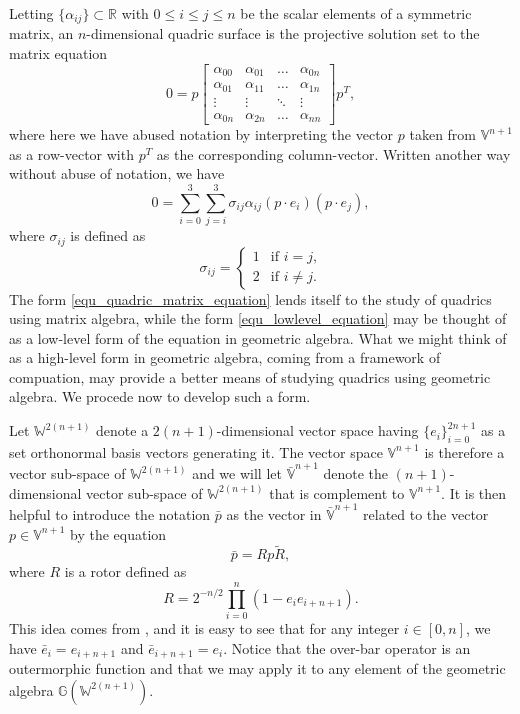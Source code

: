 \documentclass{ecgd-l}
\theoremstyle{definition}
\theoremstyle{remark}
\numberwithin{equation}{section}
\newcommand{\G}{\mathbb{G}}
\newcommand{\V}{\mathbb{V}}
\newcommand{\Vb}{\mathbb{\bar{V}}}
\newcommand{\W}{\mathbb{W}}
\newcommand{\R}{\mathbb{R}}
\begin{document}
Letting $\{\alpha_{ij}\}\subset\R$ with $0\leq i\leq j\leq n$ be the scalar elements of a symmetric
matrix, an $n$-dimensional quadric surface is the projective solution set to the
matrix equation
\begin{equation}\label{equ_quadric_matrix_equation}
0 = p\left[\begin{array}{cccc}
\alpha_{00} & \alpha_{01} & \dots & \alpha_{0n} \\
\alpha_{01} & \alpha_{11} & \dots & \alpha_{1n} \\
\vdots & \vdots & \ddots & \vdots \\
\alpha_{0n} & \alpha_{2n} & \dots & \alpha_{nn}
\end{array}\right]p^T,
\end{equation}
where here we have abused notation by interpreting the vector $p$ taken from $\V^{n+1}$ as
a row-vector with $p^T$ as the corresponding column-vector.  Written another
way without abuse of notation, we have
\begin{equation}\label{equ_lowlevel_equation}
0 = \sum_{i=0}^3\sum_{j=i}^3\sigma_{ij}\alpha_{ij}(p\cdot e_i)(p\cdot e_j),
\end{equation}
where $\sigma_{ij}$ is defined as
\begin{equation}
\sigma_{ij} = \left\{\begin{array}{ll}
1 & \mbox{if $i=j$,} \\
2 & \mbox{if $i\neq j$.}
\end{array}\right.
\end{equation}
The form \eqref{equ_quadric_matrix_equation} lends itself to the study
of quadrics using matrix algebra, while the form \eqref{equ_lowlevel_equation}
may be thought of as a low-level form of the equation in geometric algebra.
What we might think of as a high-level form in geometric algebra, coming from
a framework of compuation, may provide a better means of studying quadrics
using geometric algebra.  We procede now to develop such a form.

Let $\W^{2(n+1)}$ denote a $2(n+1)$-dimensional vector space
having $\{e_i\}_{i=0}^{2n+1}$ as a set orthonormal basis vectors
generating it.  The vector space $\V^{n+1}$ is therefore a vector
sub-space of $\W^{2(n+1)}$ and we will let $\Vb^{n+1}$ denote
the $(n+1)$-dimensional vector sub-space of $\W^{2(n+1)}$ that
is complement to $\V^{n+1}$.  It is then helpful to introduce the
notation $\bar{p}$ as the vector in $\Vb^{n+1}$ related to the
vector $p\in\V^{n+1}$ by the equation
\begin{equation}
\bar{p} = Rp\tilde{R},
\end{equation}
where $R$ is a rotor defined as
\begin{equation}
R = 2^{-n/2}\prod_{i=0}^n\left(1-e_ie_{i+n+1}\right).
\end{equation}
This idea comes from \cite{DoranHestenes93}, and it is easy to see
that for any integer $i\in[0,n]$, we have $\bar{e}_i=e_{i+n+1}$
and $\bar{e}_{i+n+1}=e_i$.  Notice that the over-bar operator
is an outermorphic function and that we may apply it to any element
of the geometric algebra $\G(\W^{2(n+1)})$.
\end{document}

